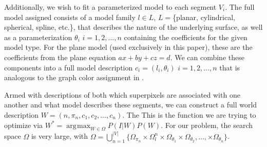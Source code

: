 \documentclass[10pt,letterpaper]{article}
\DeclareMathOperator*{\argmax}{arg\!max}
\begin{document}
	Additionally, we wish to fit a parameterized model to each segment $V_i$. The full model assigned consists of a model family $l\in{L}$,  $L=$\{planar, cylindrical, spherical, spline, etc.\}, that describes the nature of the underlying surface, as well as a parameterization $\theta_i$ $i=1,2,\ldots,n$ containing the coefficients for the given model type. For the plane model (used exclusively in this paper), these are the coefficients from the plane equation $ax+by+cz=d$. We can combine these components into a full model description $c_i=(l_i,\theta_i)$ $i=1,2,\ldots,n$ that is analogous to the graph color assignment in \cite{swendsen1987nonuniversal}.
	
	Armed with descriptions of both which superpixels are associated with one another and what model describes these segments, we can construct a full world description $W=(n,\pi_n,c_1,c_2,\ldots,c_n)$. The  This is the function we are trying to optimize via $W^*={\argmax}_{W\in\Omega} P(I|W)P(W)$. For our problem, the search space $\Omega$ is very large, with $\Omega=\bigcup_{n=1}^{|V|}\{\Omega_{\pi_n} \times\Omega_{l}^n \times\Omega_{\theta_1} \times\Omega_{\theta_2},\ldots, \times\Omega_{\theta_n}\}$.
\end{document}
